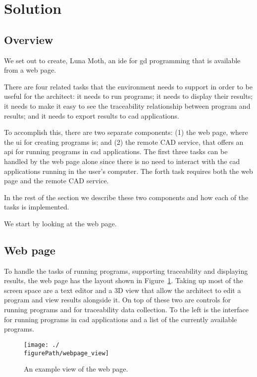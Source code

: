 
\section{Solution}
\label{sec:solution}


\subsection{Overview}
We set out to create, Luna Moth, an \gls{ide} for \gls{gd} programming that is available from a web page.

There are four related tasks that the environment needs to support in order to be useful for the architect:
it needs to run programs; it needs to display their results; it needs to make it easy to see the traceability relationship between program and results; and it needs to export results to \gls{cad} applications.

To accomplish this, there are two separate components: (1) the web page, where the \gls{ui} for creating programs is; and (2) the remote CAD service, that offers an \gls{api} for running programs in \gls{cad} applications.
The first three tasks can be handled by the web page alone since there is no need to interact with the \gls{cad} applications running in the user's computer.
The forth task requires both the web page and the remote CAD service.

In the rest of the section we describe these two components and how each of the tasks is implemented.

We start by looking at the web page.


\subsection{Web page}
To handle the tasks of running programs, supporting traceability and displaying results, the web page has the layout shown in Figure~\ref{fig:page:view}.
Taking up most of the screen space are a text editor and a 3D view that allow the architect to edit a program and view results alongside it.
On top of these two are controls for running programs and for traceability data collection.
To the left is the interface for running programs in \gls{cad} applications and a list of the currently available programs.


\begin{figure}
  \centering
  \texttt{[image: ./\\figurePath/webpage\_view]}
  \caption{An example view of the web page.}
  \label{fig:page:view}
\end{figure}


